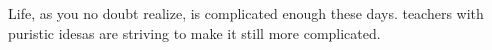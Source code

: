 \documentclass{article}
\begin{document}
Life, as you no doubt realize, is complicated enough these days.
 teachers with puristic idesas
are striving to make it still more complicated.
\end{document}
